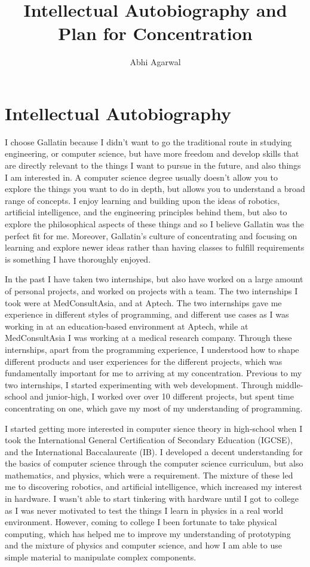 \documentclass[11pt, oneside]{article}
\title{Intellectual Autobiography and Plan for Concentration}
\author{Abhi Agarwal}
\date{}
\begin{document}
\maketitle
\section{Intellectual Autobiography}

\par I choose Gallatin because I didn't want to go the traditional route in studying engineering, or computer science, but have more freedom and develop skills that are directly relevant to the things I want to pursue in the future, and also things I am interested in. A computer science degree usually doesn't allow you to explore the things you want to do in depth, but allows you to understand a broad range of concepts. I enjoy learning and building upon the ideas of robotics, artificial intelligence, and the engineering principles behind them, but also to explore the philosophical aspects of these things and so I believe Gallatin was the perfect fit for me. Moreover, Gallatin's culture of concentrating and focusing on learning and explore newer ideas rather than having classes to fulfill requirements is something I have thoroughly enjoyed.

\par In the past I have taken two internships, but also have worked on a large amount of personal projects, and worked on projects with a team. The two internships I took were at MedConsultAsia, and at Aptech. The two internships gave me experience in different styles of programming, and different use cases as I was working in at an education-based environment at Aptech, while at MedConsultAsia I was working at a medical research company. Through these internships, apart from the programming experience, I understood how to shape different products and user experiences for the different projects, which was fundamentally important for me to arriving at my concentration. Previous to my two internships, I started experimenting with web development. Through middle-school and junior-high, I worked over over 10 different projects, but spent time concentrating on one, which gave my most of my understanding of programming.

\par I started getting more interested in computer sience theory in high-school when I took the International General Certification of Secondary Education (IGCSE), and the International Baccalaureate (IB). I developed a decent understanding for the basics of computer science through the computer science curriculum, but also mathematics, and physics, which were a requirement. The mixture of these led me to discovering robotics, and artificial intelligence, which increased my interest in hardware. I wasn't able to start tinkering with hardware until I got to college as I was never motivated to test the things I learn in physics in a real world environment. However, coming to college I been fortunate to take physical computing, which has helped me to improve my understanding of prototyping and the mixture of physics and computer science, and how I am able to use simple material to manipulate complex components.
\end{document}
